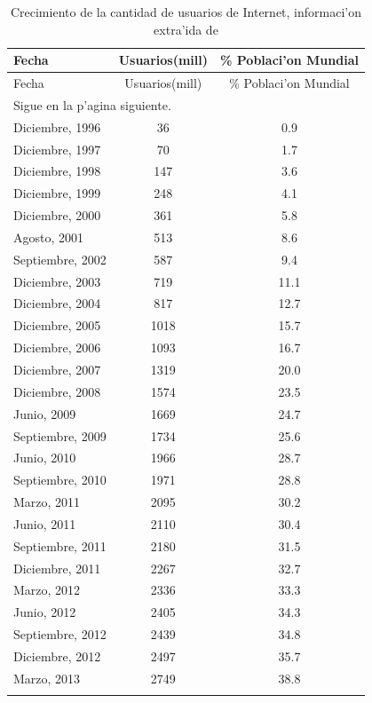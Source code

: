 \begin{longtable}{l c c}
\hline
 Fecha & Usuarios(mill) & \% Poblaci'on Mundial\\
\hline \hline
\endfirsthead

\hline
 Fecha & Usuarios(mill) & \% Poblaci'on Mundial\\
\hline \hline
\endhead

\multicolumn{3}{l}{Sigue en la p'agina siguiente.}
\endfoot

\endlastfoot

\hline
Diciembre, 1995 & 16 & 0.4 \\
Diciembre, 1996 & 36 & 0.9 \\
Diciembre, 1997 & 70 & 1.7 \\
Diciembre, 1998 & 147 & 3.6 \\
Diciembre, 1999 & 248 & 4.1 \\
Diciembre, 2000 & 361 & 5.8 \\
Agosto, 2001 & 513 & 8.6 \\
Septiembre, 2002 & 587 & 9.4 \\
Diciembre,  2003 & 719 & 11.1 \\
Diciembre,  2004 & 817 & 12.7 \\
Diciembre,  2005 & 1018 & 15.7 \\
Diciembre, 2006 & 1093 & 16.7 \\
Diciembre, 2007 & 1319 & 20.0 \\
Diciembre, 2008 & 1574 & 23.5 \\
Junio, 2009 & 1669 & 24.7 \\
Septiembre, 2009 & 1734 & 25.6 \\
Junio, 2010 & 1966 & 28.7 \\
Septiembre, 2010 & 1971 & 28.8 \\
Marzo, 2011 & 2095 & 30.2 \\
Junio, 2011 & 2110 & 30.4 \\
Septiembre, 2011 & 2180 & 31.5 \\
Diciembre, 2011 & 2267 & 32.7 \\
Marzo, 2012 & 2336 & 33.3 \\
Junio, 2012 & 2405 & 34.3 \\
Septiembre, 2012 & 2439 & 34.8 \\
Diciembre, 2012 & 2497 & 35.7 \\
Marzo, 2013 & 2749 & 38.8 \\
\hline
\caption{Crecimiento de la cantidad de usuarios de Internet, informaci'on extra'ida de \cite{iws}}
\label{cuadroCrecInternet}
\end{longtable}

